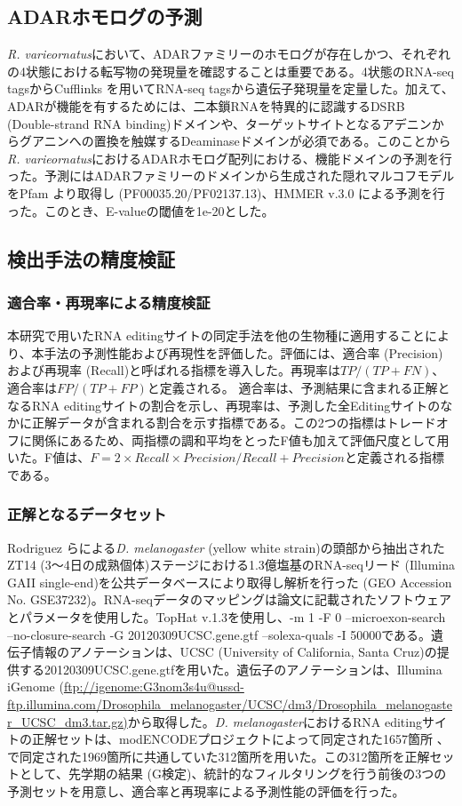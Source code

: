 \subsection{ADARホモログの予測}
{\it R. varieornatus}において、ADARファミリーのホモログが存在しかつ、それぞれの4状態における転写物の発現量を確認することは重要である。4状態のRNA-seq tagsからCufflinks \citep{pmid22383036}を用いてRNA-seq tagsから遺伝子発現量を定量した。加えて、ADARが機能を有するためには、二本鎖RNAを特異的に認識するDSRB (Double-strand RNA binding)ドメインや、ターゲットサイトとなるアデニンからグアニンへの置換を触媒するDeaminaseドメインが必須である。このことから{\it R. varieornatus}におけるADARホモログ配列における、機能ドメインの予測を行った。予測にはADARファミリーのドメインから生成された隠れマルコフモデルをPfam \citep{pmid22127870}より取得し (PF00035.20/PF02137.13)、HMMER v.3.0 \citep{pmid22039361}による予測を行った。このとき、E-valueの閾値を1e-20とした。

\subsection{検出手法の精度検証}
\subsubsection{適合率・再現率による精度検証}
本研究で用いたRNA editingサイトの同定手法を他の生物種に適用することにより、本手法の予測性能および再現性を評価した。評価には、適合率 (Precision)および再現率 (Recall)と呼ばれる指標を導入した。再現率は$TP/(TP+FN)$、適合率は$FP/(TP+FP)$と定義される。 適合率は、予測結果に含まれる正解となるRNA editingサイトの割合を示し、再現率は、予測した全Editingサイトのなかに正解データが含まれる割合を示す指標である。この2つの指標はトレードオフに関係にあるため、両指標の調和平均をとったF値も加えて評価尺度として用いた。F値は、$F=2 \times Recall \times Precision/Recall+Precision$と定義される指標である。

\subsubsection{正解となるデータセット}
Rodriguez \citep{pmid22658416}らによる{\it D. melanogaster} (yellow white strain)の頭部から抽出されたZT14 (3〜4日の成熟個体)ステージにおける1.3億塩基のRNA-seqリード (Illumina GAII single-end)を公共データベースにより取得し解析を行った (GEO Accession No. GSE37232)。RNA-seqデータのマッピングは論文に記載されたソフトウェアとパラメータを使用した。TopHat v.1.3を使用し、-m 1 -F 0 --microexon-search --no-closure-search -G 20120309UCSC.gene.gtf --solexa-quals -I 50000である。遺伝子情報のアノテーションは、UCSC (University of California, Santa Cruz)の提供する20120309UCSC.gene.gtfを用いた。遺伝子のアノテーションは、Illumina iGenome (\url {ftp://igenome:G3nom3s4u@ussd-ftp.illumina.com/Drosophila_melanogaster/UCSC/dm3/Drosophila_melanogaster_UCSC_dm3.tar.gz)}から取得した。{\it D. melanogaster}におけるRNA editingサイトの正解セットは、modENCODEプロジェクトによって同定された1657箇所 \citep{pmid21179090}、\citep{pmid22658416}で同定された1969箇所に共通していた312箇所を用いた。この312箇所を正解セットとして、先学期の結果 (G検定)、統計的なフィルタリングを行う前後の3つの予測セットを用意し、適合率と再現率による予測性能の評価を行った。


